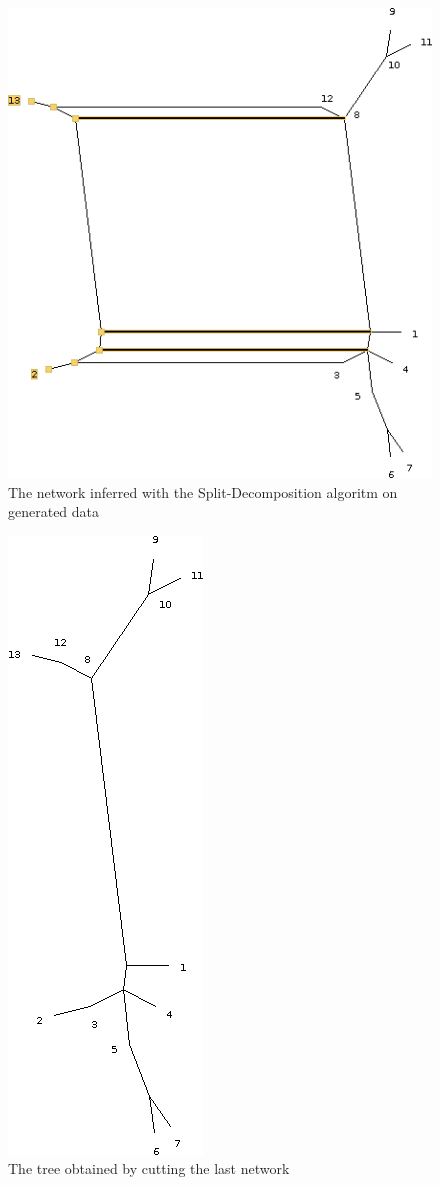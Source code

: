 \documentclass[]{article}
\theoremstyle{definition}
\begin{document}
\begin{figure}[H]
	\centering
	\includegraphics*[scale=0.35]{image/ex1qt2a.png}
	\caption{ The network inferred with the Split-Decomposition algoritm on generated data }
\end{figure}

\begin{figure}[H]
	\centering
	\includegraphics*[scale=0.35]{image/ex1qt2b.png}
	\caption{ The tree obtained by cutting the last network }
\end{figure}
\end{document}
